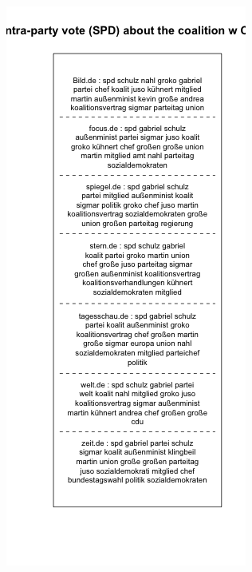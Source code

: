 \documentclass[12pt,a4paper,notitlepage]{article}
\begin{document}
\begin{figure}[H]
\begin{center}
\begin{subfigure}[normla]{0.49\textwidth}
		\end{subfigure}
		\begin{subfigure}[normla]{0.49\textwidth}
			\includegraphics[width=\textwidth]{../figs/plotquote17.png}
		\end{subfigure}
	\end{center}
\end{figure}
\end{document}
